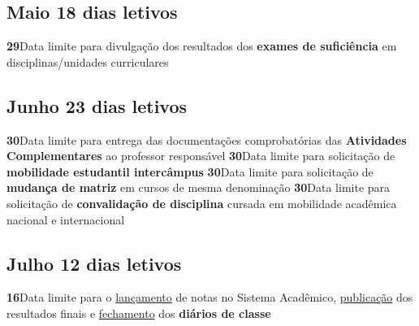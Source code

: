 \documentclass[thesis]{hmcposter}
\begin{document}
\begin{poster}
\subsection{Maio \hfill 18 dias letivos}\textbf{29}\qquad Data limite para divulgação dos resultados dos \textbf{exames de suficiência} em disciplinas/unidades curriculares \newline \null\subsection{Junho \hfill 23 dias letivos}\textbf{30}\qquad Data limite para entrega das documentações comprobatórias das \textbf{Atividades Complementares} ao professor responsável \newline \null\textbf{30}\qquad Data limite para solicitação de \textbf{mobilidade estudantil intercâmpus} \newline \null\textbf{30}\qquad Data limite para solicitação de \textbf{mudança de matriz} em cursos de mesma denominação \newline \null\textbf{30}\qquad Data limite para solicitação de \textbf{convalidação de disciplina} cursada em mobilidade acadêmica nacional e internacional \newline \null\subsection{Julho \hfill 12 dias letivos}\textbf{16}\qquad Data limite para o \underline{lançamento} de notas no Sistema Acadêmico, \underline{publicação} dos resultados finais e \underline{fechamento} dos \textbf{diários de classe} \newline \null\newpage

\end{poster}
\end{document}
